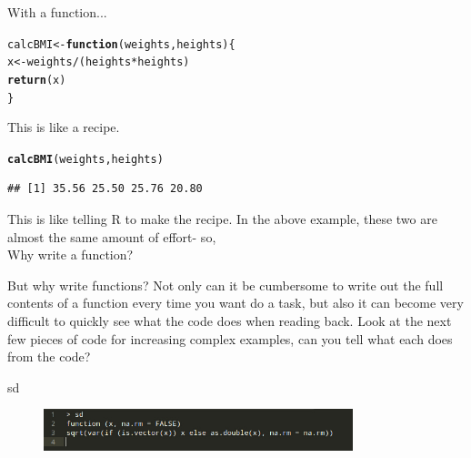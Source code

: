 \documentclass{beamer}\usepackage[]{graphicx}\usepackage[]{color}
\makeatletter
\newcommand{\hlopt}[1]{\textcolor[rgb]{0,0,0}{#1}}%
\newcommand{\hlstd}[1]{\textcolor[rgb]{0.345,0.345,0.345}{#1}}%
\newcommand{\hlkwa}[1]{\textcolor[rgb]{0.161,0.373,0.58}{\textbf{#1}}}%
\newcommand{\hlkwb}[1]{\textcolor[rgb]{0.69,0.353,0.396}{#1}}%
\newcommand{\hlkwc}[1]{\textcolor[rgb]{0.333,0.667,0.333}{#1}}%
\newcommand{\hlkwd}[1]{\textcolor[rgb]{0.737,0.353,0.396}{\textbf{#1}}}%
\newenvironment{kframe}{%
 \def\at@end@of@kframe{}%
 \ifinner\ifhmode%
  \def\at@end@of@kframe{\end{minipage}}%
  \begin{minipage}{\columnwidth}%
 \fi\fi%
 \def\FrameCommand##1{\hskip\@totalleftmargin \hskip-\fboxsep
 \colorbox{shadecolor}{##1}\hskip-\fboxsep
     \hskip-\linewidth \hskip-\@totalleftmargin \hskip\columnwidth}%
 \MakeFramed {\advance\hsize-\width
   \@totalleftmargin\z@ \linewidth\hsize
   \@setminipage}}%
 {\par\unskip\endMakeFramed%
 \at@end@of@kframe}
\newenvironment{knitrout}{}{} %
\makeatother
\begin{document}
\begin{frame}[fragile]{With a function...}
\begin{knitrout}
\color{fgcolor}\begin{kframe}
\begin{alltt}
\hlstd{calcBMI} \hlkwb{<-} \hlkwa{function}\hlstd{(}\hlkwc{weights}\hlstd{,} \hlkwc{heights}\hlstd{) \{}
    \hlstd{x} \hlkwb{<-} \hlstd{weights}\hlopt{/}\hlstd{(heights} \hlopt{*} \hlstd{heights)}
    \hlkwd{return}\hlstd{(x)}
\hlstd{\}}
\end{alltt}
\end{kframe}
\end{knitrout}

This is like a recipe.
\begin{knitrout}
\color{fgcolor}\begin{kframe}
\begin{alltt}
\hlkwd{calcBMI}\hlstd{(weights, heights)}
\end{alltt}
\begin{verbatim}
## [1] 35.56 25.50 25.76 20.80
\end{verbatim}
\end{kframe}
\end{knitrout}

This is like telling R to make the recipe.
\linebreak
\linebreak
In the above example, these two are almost the same amount of effort- so,\\
Why write a function?\\
\end{frame}


\begin{frame}[fragile]{But why write functions?}
Not only can it be cumbersome to write out the full contents of a function every time you want do a task, but also it can become very difficult to quickly see what the code does when reading back.
\linebreak
\linebreak
Look at the next few pieces of code for increasing complex examples, can you tell what each does from the code?

\end{frame}


\begin{frame}[fragile]{sd}
\begin{figure}[ht!]
\centering
\includegraphics[width=90mm]{pictures/sd.jpg}
\label{overflow}
\end{figure}
\end{frame}
\end{document}
